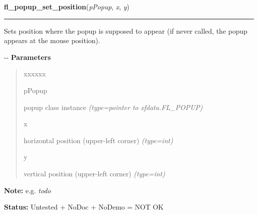 \hspace{.8\funcindent}\begin{boxedminipage}{\funcwidth}

    \raggedright \textbf{fl\_popup\_set\_position}(\textit{pPopup}, \textit{x}, \textit{y})

    \vspace{-1.5ex}

    \rule{\textwidth}{0.5\fboxrule}
\setlength{\parskip}{2ex}

Sets position where the popup is supposed to appear (if never called,
the popup appears at the mouse position).

-{}-
\setlength{\parskip}{1ex}
      \textbf{Parameters}
      \vspace{-1ex}

      \begin{quote}
        \begin{Ventry}{xxxxxx}

          \item[pPopup]


popup class instance
            {\it (type=pointer to xfdata.FL\_POPUP)}

          \item[x]


horizontal position (upper-left corner)
            {\it (type=int)}

          \item[y]


vertical position (upper-left corner)
            {\it (type=int)}

        \end{Ventry}

      \end{quote}

\textbf{Note:} 
e.g. \emph{todo}


\textbf{Status:} 
Untested + NoDoc + NoDemo = NOT OK


    \end{boxedminipage}

    \label{xformslib:flpopup:fl_popup_get_policy}

    \vspace{0.5ex}


